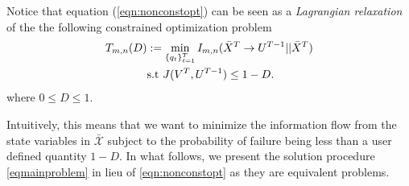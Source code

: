 Notice that equation (\ref{eqn:nonconstopt}) can be seen as a \emph{Lagrangian relaxation} of the the following constrained optimization problem
\begin{align}\label{eqn:constopt}
T_{m,n}(D) & := \min_{\{q_t\}_{t=1}^T} I_{m,n}(\bar{X}^T \rightarrow U^{T-1}||\bar{X}^T) \\
& \textrm{s.t } J(V^{T},U^{T-1}) \leq 1 - D. \nonumber
\end{align}
where $0\leq D \leq 1$.

Intuitively, this means that we want to minimize the information flow from the state variables in $\mathcal{\bar{X}}$ subject to the probability of failure being less than a user defined quantity $1-D$. In what follows, we present the solution procedure \eqref{eqmainproblem} in lieu of \eqref{eqn:nonconstopt} as they are equivalent problems. 


